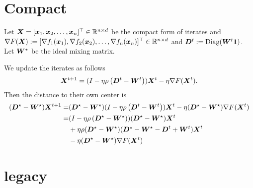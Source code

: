 \documentclass{article}
\begin{document}
\section{Compact}
Let $\bm{X}=[\bm{x}_1, \bm{x}_2, \ldots, \bm{x}_n]^\top \in\mathbb{R}^{n\times d}$ be the compact form of iterates and $\nabla F(\bm{X}):= [\nabla f_1(\bm{x}_1), \nabla f_2(\bm{x}_2), \ldots, \nabla f_n(\bm{x}_n)]^\top \in\mathbb{R}^{n\times d}$ and $\bm{D}^t:=\text{Diag}(\bm{W}^t\bm{1})$. 
Let $\bm{W}^\star$ be the ideal mixing matrix.

We update the iterates as follows
\begin{equation}
  \label{eq:X:iterate}
  \bm{X}^{t+1} = (I - \eta\rho \left( \bm{D}^t - \bm{W}^t \right)) \bm{X}^t - \eta \nabla F(\bm{X}^t).
\end{equation}
Then the distance to their own center is
\begin{align*}
  (\bm{D}^\star - \bm{W}^\star) \bm{X}^{t+1}
  = & (\bm{D}^\star - \bm{W}^\star)(I - \eta\rho \left( \bm{D}^t - \bm{W}^t \right)) \bm{X}^t
  -\eta(\bm{D}^\star - \bm{W}^\star) \nabla F(\bm{X}^t) \\
  = & (I - \eta\rho \left( \bm{D}^\star - \bm{W}^\star \right)) (\bm{D}^\star - \bm{W}^\star) \bm{X}^t \\
  & + \eta\rho(\bm{D}^\star - \bm{W}^\star)(\bm{D}^\star - \bm{W}^\star - \bm{D}^t + \bm{W}^t) \bm{X}^t \\
  & -\eta(\bm{D}^\star - \bm{W}^\star) \nabla F(\bm{X}^t) \\
  \end{align*}


\section{legacy}
\end{document}
